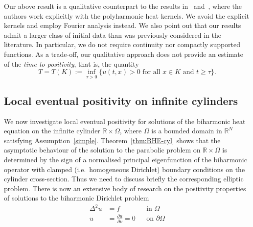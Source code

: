 \documentclass[a4paper, reqno,titlepage]{amsart}
\numberwithin{equation}{section}
\theoremstyle{plain}
\theoremstyle{definition}
\theoremstyle{remark}
\newcommand{\RR}{\mathbb{R}}
\begin{document}
Our above result is a qualitative counterpart to the results in~\cite{GG-lep} and~\cite{FF-lep}, where the authors work explicitly with the polyharmonic heat kernels. We avoid the explicit kernels and employ Fourier analysis instead. We also point out that our results admit a larger class of initial data than was previously considered in the literature. In particular, we do not require continuity nor compactly supported functions. As a trade-off, our qualitative approach does not provide an estimate of the \emph{time to positivity}, that is, the quantity
\begin{equation*}
  T = T(K) := \inf_{\tau > 0} \{ u(t,x) > 0 \text{ for all } x \in K \text{ and } t \geq \tau \}.
\end{equation*}

\subsection{Local eventual positivity on infinite cylinders}
\label{sec:4}
We now investigate local eventual positivity for solutions of the biharmonic heat equation on the infinite cylinder $\RR \times \Omega$, where $\Omega$ is a bounded domain in $\RR^N$ satisfying Assumption~\ref{simple}. Theorem~\ref{thm:BHE-cyl} shows that the asymptotic behaviour of the solution to the parabolic problem on $\RR \times \Omega$ is determined by the sign of a normalised principal eigenfunction of the biharmonic operator with clamped (i.e.\ homogeneous Dirichlet) boundary conditions on the cylinder cross-section. Thus we need to discuss briefly the corresponding elliptic problem. There is now an extensive body of research on the positivity properties of solutions to the biharmonic Dirichlet problem
\begin{equation}
  \label{eq:BH-bvp2}
  \begin{aligned}
    \Delta^2 u & = f                                   &  & \text{in } \Omega         \\
    u          & = \frac{\partial u}{\partial \nu} = 0 &  & \text{on } \partial\Omega
  \end{aligned}
\end{equation}
\end{document}
